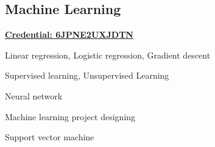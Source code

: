 \subsection{Machine Learning}
\vspace{\topsep}
\href{https://www.coursera.org/account/accomplishments/verify/6JPNE2UXJDTN}{\bf Credential: 6JPNE2UXJDTN}
\begin{tightitemize}
\item Linear regression, Logistic regression, Gradient descent
\item Supervised learning, Unsupervised Learning
\item Neural network
\item Machine learning project designing
\item Support vector machine
\end{tightitemize}

\sectionspace